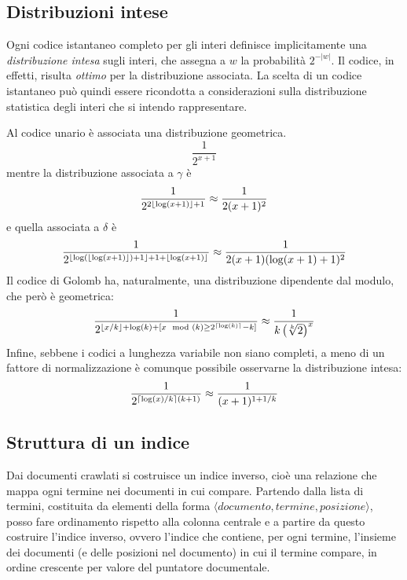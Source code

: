 \subsection{Distribuzioni intese}
Ogni codice istantaneo completo per gli interi definisce implicitamente una \textit{distribuzione intesa} sugli interi, che assegna a $w$ la probabilità $2^{-|w|}$. Il codice, in effetti, risulta \textit{ottimo} per la distribuzione associata. La scelta di un codice istantaneo può quindi essere ricondotta a considerazioni sulla distribuzione statistica degli interi che si intendo rappresentare.

Al codice unario è associata una distribuzione geometrica.
\begin{equation*}
    \frac{1}{2^{x + 1}}
\end{equation*}
mentre la distribuzione associata a $\gamma$ è
\begin{equation*}
    \frac{1}{2^{2\left\lfloor \log(x + 1) \right\rfloor + 1}} \approx \frac{1}{2(x + 1)^2}
\end{equation*}
e quella associata a $\delta$ è
\begin{equation*}
    \frac{1}{2^{\left\lfloor \log(\left\lfloor \log(x + 1) \right\rfloor) + 1 \right\rfloor + 1 + \left\lfloor \log(x + 1) \right\rfloor}} \approx \frac{1}{2(x + 1)(\log(x + 1) + 1)^2}
\end{equation*}
Il codice di Golomb ha, naturalmente, una distribuzione dipendente dal modulo, che però è geometrica:
\begin{equation*}
    \frac{1}{2^{\left\lfloor x / k \right\rfloor + \log(k) + [x\mod(k) \geq 2^{\left\lceil \log(k) \right\rceil} - k]}} \approx \frac{1}{k\left(\sqrt[k]{2}\right)^x}
\end{equation*}
Infine, sebbene i codici a lunghezza variabile non siano completi, a meno di un fattore di normalizzazione è comunque possibile osservarne la distribuzione intesa:
\begin{equation*}
    \frac{1}{2^{\left\lceil \log(x) / k \right\rceil(k + 1)}} \approx \frac{1}{(x + 1)^{1 + 1/k}}
\end{equation*}
\subsection{Struttura di un indice}
Dai documenti crawlati si costruisce un indice inverso, cioè una relazione che mappa ogni termine nei documenti in cui compare. Partendo dalla lista di termini, costituita da elementi della forma $\langle documento, termine, posizione \rangle$, posso fare ordinamento rispetto alla colonna centrale e a partire da questo costruire l'indice inverso, ovvero l'indice che contiene, per ogni termine, l'insieme dei documenti (e delle posizioni nel documento) in cui il termine compare, in ordine crescente per valore del puntatore documentale.

